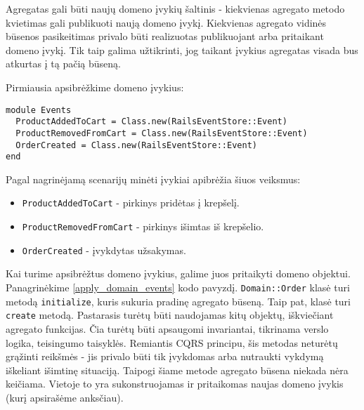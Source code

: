 Agregatas gali būti naujų domeno įvykių šaltinis - kiekvienas agregato metodo kvietimas gali publikuoti naują domeno įvykį. Kiekvienas agregato vidinės būsenos pasikeitimas privalo būti realizuotas publikuojant arba pritaikant domeno įvykį. Tik taip galima užtikrinti, jog taikant įvykius agregatas visada bus atkurtas į tą pačią būseną.

Pirmiausia apsibrėžkime domeno įvykius:

\begin{lstlisting}[]
module Events
  ProductAddedToCart = Class.new(RailsEventStore::Event)
  ProductRemovedFromCart = Class.new(RailsEventStore::Event)
  OrderCreated = Class.new(RailsEventStore::Event)
end
\end{lstlisting}

Pagal nagrinėjamą scenarijų minėti įvykiai apibrėžia šiuos veiksmus:

\begin{itemize}
  \item \lstinline|ProductAddedToCart| - pirkinys pridėtas į krepšelį.
  \item \lstinline|ProductRemovedFromCart| - pirkinys išimtas iš krepšelio.
  \item \lstinline|OrderCreated| - įvykdytas užsakymas.
\end{itemize}

Kai turime apsibrėžtus domeno įvykius, galime juos pritaikyti domeno objektui. Panagrinėkime \ref{apply_domain_events} kodo pavyzdį. \lstinline|Domain::Order| klasė turi metodą \lstinline|initialize|, kuris sukuria pradinę agregato būseną. Taip pat, klasė turi \lstinline|create| metodą. Pastarasis turėtų būti naudojamas kitų objektų, iškviečiant agregato funkcijas. Čia turėtų būti apsaugomi invariantai, tikrinama verslo logika, teisingumo taisyklės. Remiantis CQRS principu, šis metodas neturėtų grąžinti reikšmės - jis privalo būti tik įvykdomas arba nutraukti vykdymą iškeliant išimtinę situaciją. Taipogi šiame metode agregato būsena niekada nėra keičiama. Vietoje to yra sukonstruojamas ir pritaikomas naujas domeno įvykis (kurį apsirašėme anksčiau).

